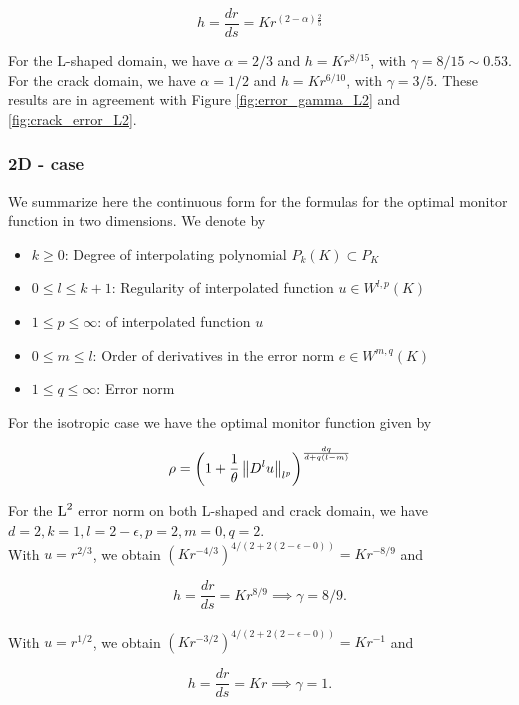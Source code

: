 \documentclass[a4paper,11pt]{article}
\begin{document}
$$h = \frac{dr}{ds} = K r^{(2 -\alpha)\frac{2}{5}}$$

For the L-shaped domain, we have $\alpha = 2/3$ and $h = K r^{8/15}$, with $\gamma = 8/15 \sim 0.53$. For the crack domain, we have $\alpha = 1/2$ and  $h = K r^{6/10}$, with $\gamma = 3/5$. These results are in agreement with Figure \ref{fig:error_gamma_L2} and \ref{fig:crack_error_L2}. 


\subsubsection{2D - case}

We summarize here the continuous form for the formulas for the optimal monitor function in two dimensions. We denote by

\begin{itemize}
\item $k\geq 0$: Degree of interpolating polynomial  $P_{k}(K) \subset P_{K}$ 
\item $0 \leq l \leq k+1$: Regularity of interpolated function $u \in W^{l,p}(K)$
\item $1 \leq p \leq \infty$:  of interpolated function $u$
\item $0 \leq m \leq l$: Order of derivatives in the error norm $e \in W^{m,q}(K)$ 
\item $1 \leq q \leq \infty $: Error norm 
\end{itemize}

For the isotropic case we have the optimal monitor function given by

\begin{equation}
\rho = \left( 1 + \frac{1}{\theta}\left\|D^{l}u\right\|_{l^{p}}\right)^{\frac{dq}{d + q(l-m)}}
\label{eq:monitor-function-2D-isotropic}
\end{equation}


For the $\operatorname L^{2}$ error norm on both L-shaped and crack domain, we have $d=2, k=1, l=2-\epsilon, p=2, m=0, q=2$.\\

With $u = r^{2/3}$, we obtain $(Kr^{-4/3})^{4/(2+2(2-\epsilon-0))} = Kr^{-8/9}$ and 

$$h = \frac{dr}{ds} = K r^{8/9} \implies \gamma = 8/9.$$ \\


With $u = r^{1/2}$, we obtain $(Kr^{-3/2})^{4/(2+2(2-\epsilon-0))} = Kr^{-1}$ and


$$h = \frac{dr}{ds} = K r \implies \gamma = 1. $$ \\


\printbibliography
\end{document}
